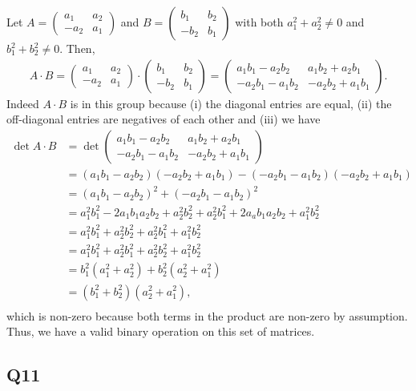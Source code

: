 \documentclass[12pt]{article}
\numberwithin{theorem}{section}
\numberwithin{equation}{section}
\numberwithin{remark}{section}
\numberwithin{definition}{section}
\numberwithin{theorem}{section}
\numberwithin{lemma}{section}
\numberwithin{example}{section}
\begin{document}
Let $A=\begin{pmatrix}a_1 & a_2 \\ -a_2 & a_1 \end{pmatrix}$ and $B=\begin{pmatrix}b_1 & b_2 \\ -b_2 & b_1 \end{pmatrix}$ with both $a_1^2+a_2^2\neq 0$ and $b_1^2+b_2^2\neq 0$. Then,
\begin{align*}
	A\cdot B = \begin{pmatrix}a_1 & a_2 \\ -a_2 & a_1 \end{pmatrix} \cdot \begin{pmatrix}b_1 & b_2 \\ -b_2 & b_1 \end{pmatrix} = \begin{pmatrix}a_1b_1-a_2b_2 & a_1b_2+a_2b_1 \\ -a_2b_1-a_1b_2 & -a_2b_2+a_1b_1 \end{pmatrix}.
\end{align*}
Indeed $A\cdot B$ is in this group because (i) the diagonal entries are equal, (ii) the off-diagonal entries are negatives of each other and (iii) we have
\begin{align*}
	\det{A\cdot B} & = \det{\begin{pmatrix}a_1b_1-a_2b_2 & a_1b_2+a_2b_1 \\ -a_2b_1-a_1b_2 & -a_2b_2+a_1b_1 \end{pmatrix}} \\
	& = (a_1b_1-a_2b_2)(-a_2b_2+a_1b_1)-(-a_2b_1-a_1b_2)(-a_2b_2+a_1b_1)\\
	& = (a_1b_1-a_2b_2)^2+(-a_2b_1-a_1b_2)^2\\
	& = a_1^2b_1^2-2a_1b_1a_2b_2+a_2^2b_2^2+a_2^2b_1^2+2a_ab_1a_2b_2+a_1^2b_2^2\\
	& = a_1^2b_1^2+a_2^2b_2^2+a_2^2b_1^2+a_1^2b_2^2\\
	& = a_1^2b_1^2+a_2^2b_1^2+a_2^2b_2^2+a_1^2b_2^2\\
	& = b_1^2(a_1^2+a_2^2)+b_2^2(a_2^2+a_1^2)\\
	& = (b_1^2+b_2^2)(a_2^2+a_1^2),\\
\end{align*}
which is non-zero because both terms in the product are non-zero by assumption. Thus, we have a valid binary operation on this set of matrices. 



\subsection{Q11}
\end{document}
